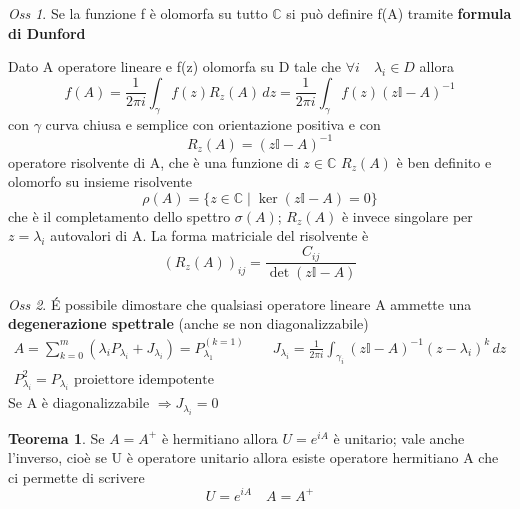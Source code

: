 \documentclass[a4paper,11pt]{report}
\theoremstyle{remark}
\newtheorem*{oss}{Oss}
\theoremstyle{definition}
\newtheorem*{teo}{Teorema}
\newcommand{\C}{\mathbb{C}}
\begin{document}
\begin{oss}
	Se la funzione f è olomorfa su tutto $\C$ si può definire f(A) tramite \textbf{formula di Dunford}
\end{oss}
Dato A operatore lineare e f(z) olomorfa su D tale che $\forall i \quad \lambda_i \in D$ allora
\begin{equation*}
	f(A) = \frac{1}{2\pi i }\int_\gamma f(z)R_z(A) \, dz = \frac{1}{2\pi i} \int_\gamma f(z){(z\mathbb{I}-A)}^{-1}
\end{equation*}
con $\gamma$ curva chiusa e semplice con orientazione positiva e con
\begin{equation*}
	R_z(A) = {(z\mathbb{I}-A)}^{-1} 
\end{equation*}
operatore risolvente di A, che è una funzione di $z \in \C $ \newline
$R_z(A)$ è ben definito e olomorfo su insieme risolvente
\begin{equation*}
	\rho(A) = \{z \in \C \; | \; \ker{(z\mathbb{I}-A)}= 0\}
\end{equation*}
che è il completamento dello spettro $\sigma(A)$; $R_z(A)$ è invece singolare per $z = \lambda_i$ autovalori di A.
\newline
La forma matriciale del risolvente è
\begin{equation*}
	{(R_z(A))}_{ij} = \frac{C_{ij}}{\det{(z\mathbb{I}-A)}}
\end{equation*}

\begin{oss}
	\'E possibile dimostare che qualsiasi operatore lineare A ammette una \textbf{degenerazione spettrale} (anche se non diagonalizzabile)
	\begin{gather*}
		A = \sum_{k=0}^m (\lambda_i P_{\lambda_i}+ J_{\lambda_i})= P^{(k=1)}_{\lambda_1} \qquad J_{\lambda_i} = \frac{1}{2\pi i} \int_{\gamma_i} {(z\mathbb{I}-A)}^{-1} {(z-\lambda_i)^k} \, dz \\
		P^2_{\lambda_i} = P_{\lambda_i} \text{ proiettore idempotente}
	\end{gather*}
	Se A è diagonalizzabile $\Rightarrow J_{\lambda_i} = 0$
\end{oss}

\begin{teo}
	Se $A = A^+$ è hermitiano allora $U=e^{iA}$ è unitario; vale anche l'inverso, cioè se U è operatore unitario allora esiste operatore hermitiano A che ci permette di scrivere 
	\begin{equation*}
		U=e^{iA} \quad A = A^+
	\end{equation*}
\end{teo}
\end{document}
